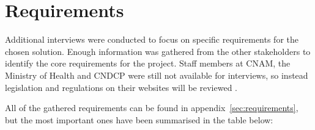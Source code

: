 \clearpage

\section{Requirements}

Additional interviews were conducted to focus on specific requirements for the chosen solution. Enough information was gathered from the other stakeholders to identify the core requirements for the project. Staff members at CNAM, the Ministry of Health and CNDCP were still not available for interviews, so instead legislation and regulations on their websites will be reviewed \parencite{CNAM,CNPDCP,ministry}. 

All of the gathered requirements can be found in appendix~\ref{sec:requirements}, but the most important ones have been summarised in the table below:

